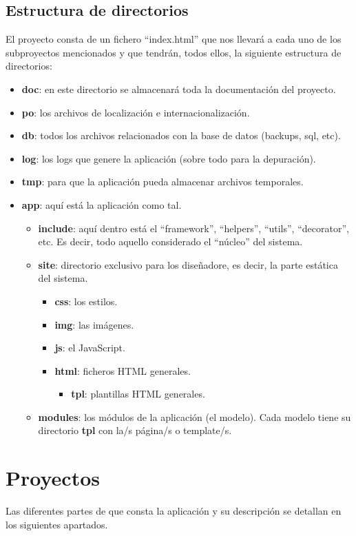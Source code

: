 \documentclass[12pt,twoside,a4paper]{article}
\begin{document}
\subsection{Estructura de directorios}
El proyecto consta de un fichero ``index.html'' que nos llevará a cada uno de los subproyectos mencionados y que tendrán, todos ellos, la siguiente estructura de directorios:
\begin{itemize}
\item \textbf{doc}: en este directorio se almacenará toda la documentación del proyecto.
\item \textbf{po}: los archivos de localización e internacionalización.
\item \textbf{db}: todos los archivos relacionados con la base de datos (backups, sql, etc).
\item \textbf{log}: los logs que genere la aplicación (sobre todo para la depuración).
\item \textbf{tmp}: para que la aplicación pueda almacenar archivos temporales.
\item \textbf{app}: aquí está la aplicación como tal.
  \begin{itemize}
  \item \textbf{include}: aquí dentro está el ``framework'', ``helpers'', ``utils'', ``decorator'', etc. Es decir, todo aquello considerado el ``núcleo'' del sistema.
  \item \textbf{site}: directorio exclusivo para los diseñadore, es decir, la parte estática del sistema.
    \begin{itemize}
    \item \textbf{css}: los estilos.
    \item \textbf{img}: las imágenes.
    \item \textbf{js}: el JavaScript.
    \item \textbf{html}: ficheros HTML generales.
      \begin{itemize}
      \item \textbf{tpl}: plantillas HTML generales.
      \end{itemize}
    \end{itemize}
  \item \textbf{modules}: los módulos de la aplicación (el modelo). Cada modelo tiene su directorio \textbf{tpl} con la/s página/s o template/s.
  \end{itemize}
\end{itemize}

\section{Proyectos}
Las diferentes partes de que consta la aplicación y su descripción se detallan en los siguientes apartados.
\end{document}

